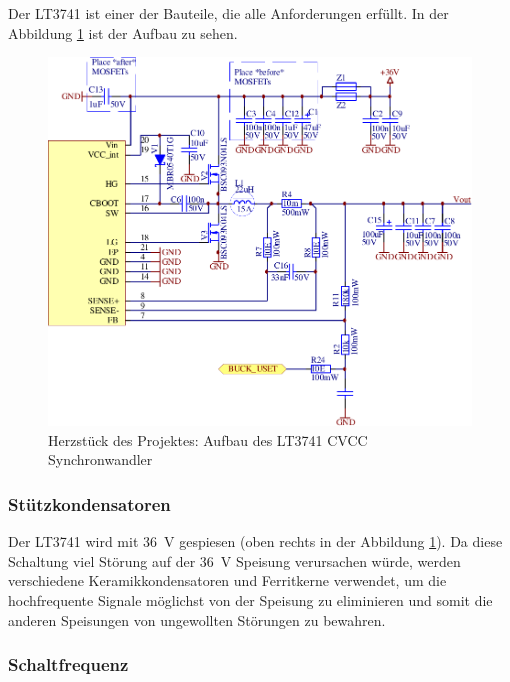 Der LT3741 ist einer der Bauteile,  die  alle  Anforderungen  erf\"ullt.  In der
Abbildung \ref{fig:circuit:buck} ist der Aufbau zu sehen.

\begin{figure}[th!]
    \center
    \includegraphics[width=.75\textwidth]{images/circuit/buck.pdf}
    \caption{Herzst\"uck des Projektes: Aufbau des LT3741 CVCC Synchronwandler}
    \label{fig:circuit:buck}
\end{figure}

\subsubsection{St\"utzkondensatoren}

Der  LT3741  wird mit \SI{36}{\volt} gespiesen (oben  rechts  in  der  Abbildung
\ref{fig:circuit:buck}).   Da   diese   Schaltung   viel   St\"orung   auf   der
\SI{36}{\volt}    Speisung     verursachen    w\"urde,    werden    verschiedene
Keramikkondensatoren  und  Ferritkerne  verwendet,  um die hochfrequente Signale
m\"oglichst von der Speisung zu eliminieren und somit die anderen Speisungen von
ungewollten St\"orungen zu bewahren.

\subsubsection{Schaltfrequenz}

